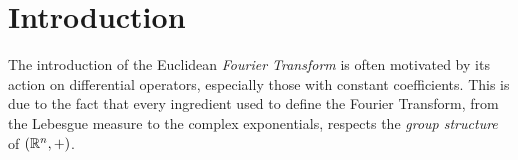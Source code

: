 \chapter{Introduction}

The introduction of the Euclidean \emph{Fourier Transform} is often motivated
by its action on differential operators,
especially those with constant coefficients.
This is due to the fact that every ingredient used to define the Fourier Transform,
from the Lebesgue measure to the complex exponentials,
respects the \emph{group structure} of $(\mathbb{R}^n, +)$.
